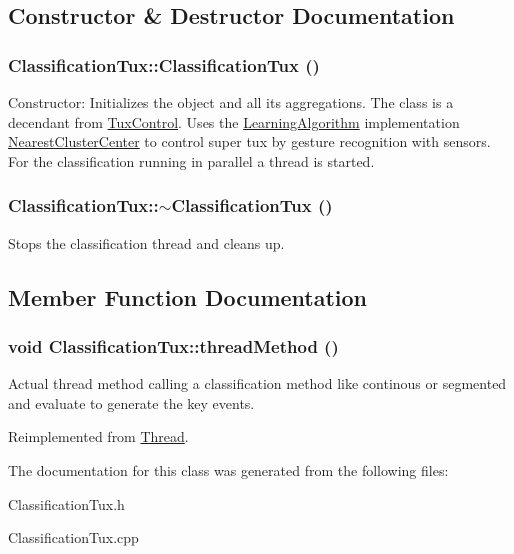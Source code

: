 \subsection{Constructor \& Destructor Documentation}
\hypertarget{classClassificationTux_ac15bcd174a9f3a53a90da07bcf14d29f}{
\subsubsection[{ClassificationTux}]{\setlength{\rightskip}{0pt plus 5cm}ClassificationTux::ClassificationTux ()}}
\label{classClassificationTux_ac15bcd174a9f3a53a90da07bcf14d29f}
Constructor: Initializes the object and all its aggregations. The class is a decendant from \hyperlink{classTuxControl}{TuxControl}. Uses the \hyperlink{classLearningAlgorithm}{LearningAlgorithm} implementation \hyperlink{classNearestClusterCenter}{NearestClusterCenter} to control super tux by gesture recognition with sensors. For the classification running in parallel a thread is started. \hypertarget{classClassificationTux_a782b740ccc0ff2726fe44564868dee47}{
\subsubsection[{$\sim$ClassificationTux}]{\setlength{\rightskip}{0pt plus 5cm}ClassificationTux::$\sim$ClassificationTux ()}}
\label{classClassificationTux_a782b740ccc0ff2726fe44564868dee47}
Stops the classification thread and cleans up. 

\subsection{Member Function Documentation}
\hypertarget{classClassificationTux_aa3824ae61c0d73ebff62c641793dc3ff}{
\subsubsection[{threadMethod}]{\setlength{\rightskip}{0pt plus 5cm}void ClassificationTux::threadMethod ()}}
\label{classClassificationTux_aa3824ae61c0d73ebff62c641793dc3ff}
Actual thread method calling a classification method like continous or segmented and evaluate to generate the key events. 

Reimplemented from \hyperlink{classThread_adc91220b96d25109b5f3ea73f8a75947}{Thread}.

The documentation for this class was generated from the following files:\begin{DoxyCompactItemize}
\item 
ClassificationTux.h\item 
ClassificationTux.cpp\end{DoxyCompactItemize}
